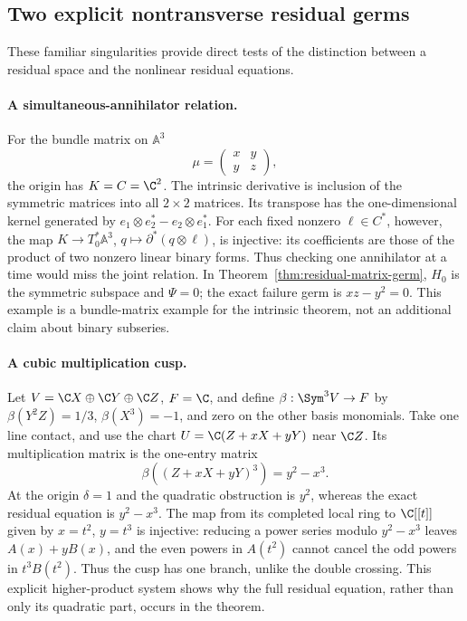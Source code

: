 \subsection{Two explicit nontransverse residual germs}
These familiar singularities provide direct tests of the distinction
between a residual space and the nonlinear residual equations.

\paragraph{A simultaneous-annihilator relation.}
For the bundle matrix on $\mathbb A^3$
\[
 \mu=\begin{pmatrix}x&y\\ y&z\end{pmatrix},
\]
the origin has $K=C=\C^2$. The intrinsic derivative is inclusion
of the symmetric matrices into all $2\times2$ matrices. Its transpose
has the one-dimensional kernel generated by
$e_1\otimes e_2^*-e_2\otimes e_1^*$. For each fixed nonzero
$\ell\in C^*$, however, the map
$K\to T_0^*\mathbb A^3$, $q\mapsto\partial^*(q\otimes\ell)$,
is injective: its coefficients are those of the product of two
nonzero linear binary forms. Thus checking one annihilator at a time
would miss the joint relation. In
Theorem~\ref{thm:residual-matrix-germ}, $H_0$ is the symmetric
subspace and $\Psi=0$; the exact failure germ is $xz-y^2=0$.
This example is a bundle-matrix example for the intrinsic theorem,
not an additional claim about binary subseries.

\paragraph{A cubic multiplication cusp.}\label{ex:cubic-residual-cusp}
Let $V=\C X\oplus\C Y\oplus\C Z$, $F=\C$, and define
$\beta:\Sym^3V\to F$ by
$\beta(Y^2Z)=1/3$, $\beta(X^3)=-1$, and zero on the other
basis monomials. Take one line contact, and use the chart
$U=\C(Z+xX+yY)$ near $\C Z$. Its multiplication matrix is the
one-entry matrix
\[
 \beta((Z+xX+yY)^3)=y^2-x^3.
\]
At the origin $\delta=1$ and the quadratic obstruction is $y^2$,
whereas the exact residual equation is $y^2-x^3$. The map from its
completed local ring to $\C[[t]]$ given by $x=t^2$, $y=t^3$
is injective: reducing a power series modulo $y^2-x^3$ leaves
$A(x)+yB(x)$, and the even powers in $A(t^2)$ cannot cancel the
odd powers in $t^3B(t^2)$. Thus the cusp has one branch, unlike the
double crossing. This explicit higher-product system shows why the
full residual equation, rather than only its quadratic part, occurs
in the theorem.
